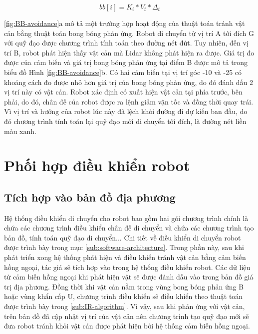 \begin{equation}
    bb[i] = K_i*V_t*\Delta_t
    \label{equa:BB-update}
\end{equation}

\figurename{ \ref{fig:BB-avoidance}}a mô tả một trường hợp hoạt động của thuật toán tránh vật cản bằng thuật toán bong bóng phản ứng. Robot di chuyển từ vị trí A tới đích G với quỹ đạo được chương trình  tính toán theo đường nét đứt. Tuy nhiên, đến vị trí B, robot phát hiện thấy vật cản mà Lidar không phát hiện ra được. Giá trị đo được của cảm biến và giá trị bong bóng phản ứng tại điểm B được mô tả trong biểu đồ Hình \ref{fig:BB-avoidance}b. Có hai cảm biến tại vị trí góc -10 và -25 có khoảng cách đo được nhỏ hơn giá trị của bong bóng phản ứng, do đó đánh dấu 2 vị trí này có vật cản. Robot xác định có xuất hiện vật cản tại phía trước, bên phải, do đó, chân đế của robot được ra lệnh giảm vận tốc và đồng thời quay trái. Vì vị trí và hướng của robot lúc này đã lệch khỏi đường đi dự kiến ban đầu, do đó chương trình  tính toán lại quỹ đạo mới di chuyển tới đích, là đường nét liền màu xanh.

\section{Phối hợp điều khiển robot}
\subsection{Tích hợp vào bản đồ địa phương}

Hệ thống điều khiển di chuyển cho robot bao gồm hai gói chương trình chính là  chứa các chương trình điều khiển chân đế di chuyển và  chứa các chương trình tạo bản đồ, tính toán quỹ đạo di chuyển... Chi tiết về điều khiển di chuyển robot được trình bày trong mục \ref{sub:software-architecture}.
Trong phần này, sau khi phát triển xong hệ thống phát hiện và điều khiển tránh vật cản bằng cảm biến hồng ngoại, tác giả sẽ tích hợp vào trong hệ thống điều khiển robot. Các dữ liệu từ cảm biến hồng ngoại khi phát hiện vật sẽ được đánh dấu vào trong bản đồ giá trị địa phương. Đồng thời khi vật cản nằm trong vùng bong bóng phản ứng B hoặc vùng khẩn cấp U, chương trình điều khiển sẽ điều khiển theo thuật toán được trình bày trong \ref{sub:IR-algorithm}. Vì vậy, sau khi phản ứng với vật cản, trên bản đồ đã cập nhật vị trí của vật cản nên chương trinh tạo quỹ đạo mới sẽ đưa robot tránh khỏi vật cản được phát hiện bởi hệ thống cảm biến hồng ngoại.

